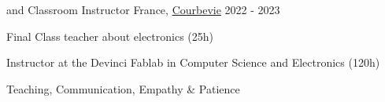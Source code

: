 \begin{cventries}
	\cventry
	{\esilv  and \emlv} %
	{Classroom Instructor} %
	{France, \href{https://www.ville-courbevoie.fr/}{Courbevie}} %
	{2022 - 2023} %
	{
		\begin{cvitems} %
			\item {Final Class teacher about electronics (25h)}
			\item {Instructor at the Devinci Fablab in Computer Science and Electronics (120h)}
		\end{cvitems}
	}
	{
		\begin{cvitemsskills} %
			\item {Teaching, Communication, Empathy \& Patience}
		\end{cvitemsskills}
	}

\end{cventries}
